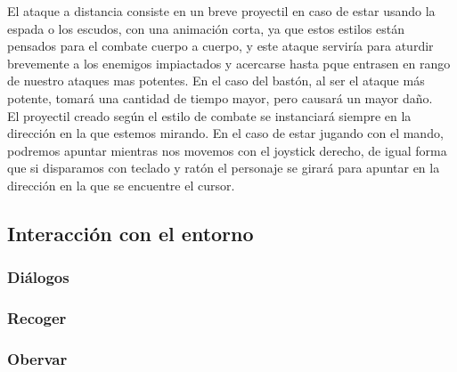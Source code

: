 \documentclass[12pt,spanish]{article}
\begin{document}
    El ataque a distancia consiste en un breve proyectil en caso de estar usando la espada o los escudos, con una animación corta, ya que estos estilos están pensados para el combate cuerpo a cuerpo, y este ataque serviría para aturdir brevemente a los enemigos impiactados y acercarse hasta pque entrasen en rango de nuestro ataques mas potentes. En el caso del bastón, al ser el ataque más potente, tomará una cantidad de tiempo mayor, pero causará un mayor daño.\\

    El proyectil creado según el estilo de combate se instanciará siempre en la dirección en la que estemos mirando. En el caso de estar jugando con el mando, podremos apuntar mientras nos movemos con el joystick derecho, de igual forma que si disparamos con teclado y ratón el personaje se girará para apuntar en la dirección en la que se encuentre el cursor.

\newpage

\subsection{Interacción con el entorno}

\subsubsection{Diálogos}

\subsubsection{Recoger}

\subsubsection{Obervar}

    
\end{document}
